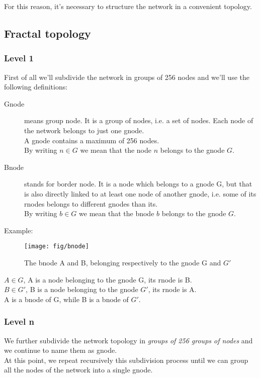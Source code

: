 \documentclass[a4paper]{article}
\begin{document}
For this reason, it's necessary to structure the network in a convenient
topology.

\subsection{Fractal topology}
\label{sec:fractal_topology}
\subsubsection{Level 1}
First of all we'll subdivide the network in groups of 256 nodes and we'll use
the following definitions:
\begin{description}
	\item[Gnode] means group node. It is a group of nodes, i.e. a set of
		nodes. Each node of the network belongs to just one gnode.\\
		A gnode contains a maximum of 256 nodes.\\
		By writing $n \in G$ we mean that the node $n$ belongs to the
		gnode $G$.
	\item[Bnode] stands for border node. It is a node which belongs to a
		gnode G, but that is also directly linked to at least one node
		of another gnode, i.e. some of its rnodes belongs to different
		gnodes than its.\\
		By writing $b \in G$ we mean that the bnode $b$ belongs to the
		gnode $G$.
\end{description}

Example:\\
\begin{figure}[h]
	\begin{center}
		\texttt{[image: fig/bnode]}
	\end{center}
	\caption{The bnode A and B, belonging respectively to the gnode G and
	$G'$}
\end{figure}
$A \in G $, A is a node belonging to the gnode G, its rnode is B.\\
$B \in G'$, B is a node belonging to the gnode $G'$, its rnode is A.\\
A is a bnode of G, while B is a bnode of $G'$.

\subsubsection{Level n}
We further subdivide the network topology in \emph{groups of 256 groups of nodes}
and we continue to name them as gnode.\\
At this point, we repeat recursively this subdivision process until
we can group all the nodes of the network into a single gnode.
\end{document}
